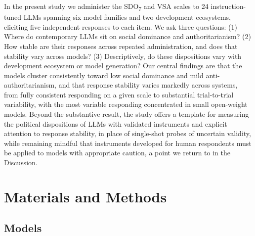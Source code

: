 \documentclass[
]{article}
\begin{document}
In the present study we administer the SDO\textsubscript{7} and VSA
scales to 24 instruction-tuned LLMs spanning six model families and two
development ecosystems, eliciting five independent responses to each
item. We ask three questions: (1) Where do contemporary LLMs sit on
social dominance and authoritarianism? (2) How stable are their
responses across repeated administration, and does that stability vary
across models? (3) Descriptively, do these dispositions vary with
development ecosystem or model generation? Our central findings are that
the models cluster consistently toward low social dominance and mild
anti-authoritarianism, and that response stability varies markedly
across systems, from fully consistent responding on a given scale to
substantial trial-to-trial variability, with the most variable
responding concentrated in small open-weight models. Beyond the
substantive result, the study offers a template for measuring the
political dispositions of LLMs with validated instruments and explicit
attention to response stability, in place of single-shot probes of
uncertain validity, while remaining mindful that instruments developed
for human respondents must be applied to models with appropriate
caution, a point we return to in the Discussion.

\section{Materials and Methods}\label{materials-and-methods}

\subsection{Models}\label{models}
\end{document}
